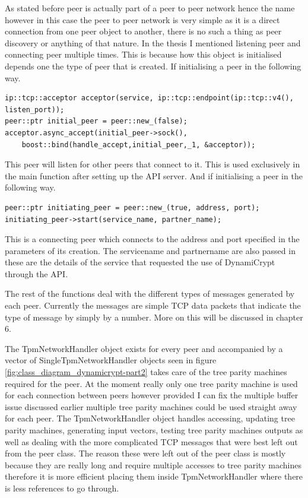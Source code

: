 As stated before peer is actually part of a peer to peer network hence the name however in this case the peer to peer network is very simple as it is a direct connection from one peer object to another, there is no such a thing as peer discovery or anything of that nature. In the thesis I mentioned listening peer and connecting peer multiple times. This is because how this object is initialised depends one the type of peer that is created. If initialising a peer in the following way. 

\begin{lstlisting}
ip::tcp::acceptor acceptor(service, ip::tcp::endpoint(ip::tcp::v4(), listen_port));
peer::ptr initial_peer = peer::new_(false);
acceptor.async_accept(initial_peer->sock(), 
    boost::bind(handle_accept,initial_peer,_1, &acceptor));
\end{lstlisting}
This peer will listen for other peers that connect to it. This is used exclusively in the main function after setting up the API server. 
And if initialising a peer in the following way.
\begin{lstlisting}
peer::ptr initiating_peer = peer::new_(true, address, port);
initiating_peer->start(service_name, partner_name);
\end{lstlisting}
This is a connecting peer which connects to the address and port specified in the parameters of its creation. The servicename and partnername are also passed in these are the details of the service that requested the use of DynamiCrypt through the API.

The rest of the functions deal with the different types of messages generated by each peer. Currently the messages are simple TCP data packets that indicate the type of message by simply by a number. More on this will be discussed in chapter 6.

The TpmNetworkHandler object exists for every peer and accompanied by a vector of SingleTpmNetworkHandler objects seen in figure \ref{fig:class_diagram_dynamicrypt-part2} takes care of the tree parity machines required for the peer. At the moment really only one tree parity machine is used for each connection between peers however provided I can fix the multiple buffer issue discussed earlier multiple tree parity machines could be used straight away for each peer. The TpmNetworkHandler object handles accessing, updating tree parity machines, generating input vectors, testing tree parity machines outputs as well as dealing with the more complicated TCP messages that were best left out from the peer class. The reason these were left out of the peer class is mostly because they are really long and require multiple accesses to tree parity machines therefore it is more efficient placing them inside TpmNetworkHandler where there is less references to go through. 

